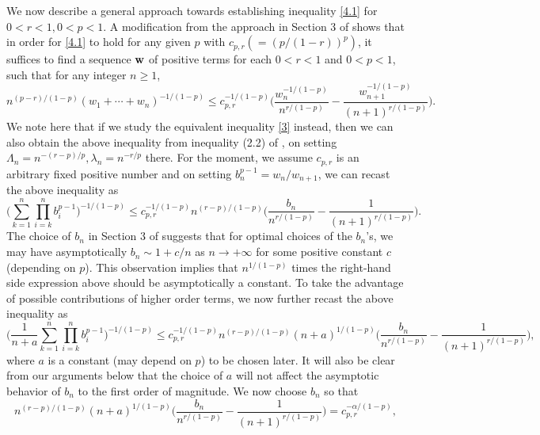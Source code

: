 \documentclass[11pt]{amsart}
\numberwithin{equation}{section}
\theoremstyle{definition}
\theoremstyle{remark}
\begin{document}
     We now describe a general approach towards establishing inequality \eqref{4.1} for $0<r<1, 0 < p < 1$. A modification from the approach in Section 3
of \cite{G6} shows
   that in order for \eqref{4.1} to hold for any given $p$ with
   $c_{p,r} (=(p/(1-r))^p)$, it suffices to find
  a sequence ${\bf w}$ of positive terms for each $0<r<1$ and $0<p < 1$, such
  that for any integer $n \geq 1$,
\begin{equation*}
 n^{(p-r)/(1-p)}(w_1+\cdots+w_n)^{-1/(1-p)} \leq
 c^{-1/(1-p)}_{p,r}
 \Big( \frac {w^{-1/(1-p)}_n}{n^{r/(1-p)}}- \frac
 {w^{-1/(1-p)}_{n+1}}{(n+1)^{r/(1-p)}}\Big).
\end{equation*}
    We note here that if we study the equivalent inequality \eqref{3} instead, then we can also obtain the above inequality from inequality
    (2.2) of \cite{G6}, on setting $\Lambda_n=n^{-(r-p)/p}, \lambda_n=n^{-r/p}$ there. For the moment, we assume $c_{p,r}$ is an
arbitrary fixed positive number and on setting
$b^{p-1}_n=w_n/w_{n+1}$, we can recast the above inequality as
\begin{equation*}
  \Big(\sum^n_{k=1}\prod^n_{i=k}b^{p-1}_i \Big )^{-1/(1-p)} \leq
 c^{-1/(1-p)}_{p,r}n^{(r-p)/(1-p)}
 \Big( \frac {b_n}{n^{r/(1-p)}}- \frac
 {1}{(n+1)^{r/(1-p)}}\Big).
\end{equation*}
  The choice of $b_n$ in Section 3 of \cite{G6} suggests that for optimal choices of the $b_n$'s, we
  may have asymptotically $b_n \sim 1+c/n$ as $n \rightarrow +\infty$ for
  some positive constant $c$ (depending on $p$). This observation implies that
  $n^{1/(1-p)}$ times the right-hand side expression above should
  be asymptotically a constant. To take the advantage of possible
  contributions of higher order terms, we now further recast the above inequality as
\begin{equation}
\label{4.2}
 \Big(\frac {1}{n+a}\sum^n_{k=1}\prod^n_{i=k}b^{p-1}_i \Big )^{-1/(1-p)} \leq
 c^{-1/(1-p)}_{p,r}n^{(r-p)/(1-p)}(n+a)^{1/(1-p)}
 \Big( \frac {b_n}{n^{r/(1-p)}}- \frac
 {1}{(n+1)^{r/(1-p)}}\Big),
\end{equation}
  where $a$ is a constant (may depend on $p$) to be chosen later. It will also be clear from our arguments below that the choice of $a$ will not affect
  the asymptotic behavior of $b_n$ to the first order of magnitude. We now choose $b_n$ so that
\begin{equation}
\label{2.3}
 n^{(r-p)/(1-p)}(n+a)^{1/(1-p)}
 \Big( \frac {b_n}{n^{r/(1-p)}}- \frac
 {1}{(n+1)^{r/(1-p)}}\Big)=c^{-\alpha/(1-p)}_{p,r},
\end{equation}
\end{document}
